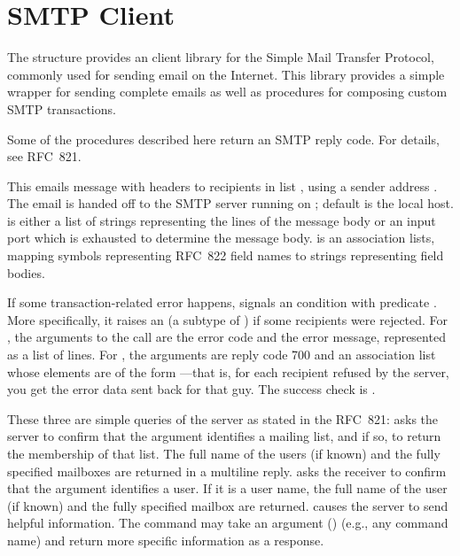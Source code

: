 \chapter{SMTP Client}\label{cha:smtp}
%
The  structure provides an client library for the Simple Mail
Transfer Protocol, commonly used for sending email on the Internet.
This library provides a simple wrapper for sending complete emails as
well as procedures for composing custom SMTP transactions.

Some of the procedures described here return an SMTP reply code.  For
details, see RFC~821.

\begin{desc}
  This emails message  with headers  to
  recipients in list , using a sender address .
  The email is handed off to the SMTP server running on ;
  default is the local host.   is either a list of strings
  representing the lines of the message body or an input port which is
  exhausted to determine the message body.   is an
  association lists, mapping symbols representing RFC~822 field names
  to strings representing field bodies.
  
  If some transaction-related error happens, 
  signals an  condition with predicate
  .  More specifically, it raises an
   (a subtype of )
  if some recipients were rejected.  For , the
  arguments to the  call are the error code and the error
  message, represented as a list of lines.  For
  , the arguments are reply code
  700 and an association list whose elements are of the form
  ---that is, for
  each recipient refused by the server, you get the error data sent
  back for that guy.  The success check is .
\end{desc}

\begin{desc}
  These three are simple queries of the server as stated in the
  RFC~821:  asks the server to confirm that the
  argument identifies a mailing list, and if so, to return the
  membership of that list.  The full name of the users (if known) and
  the fully specified mailboxes are returned in a multiline reply.
   asks the receiver to confirm that the argument
  identifies a user.  If it is a user name, the full name of the user
  (if known) and the fully specified mailbox are returned.
   causes the server to send helpful information.
  The command may take an argument () (e.g., any command
  name) and return more specific information as a response.
\end{desc}

